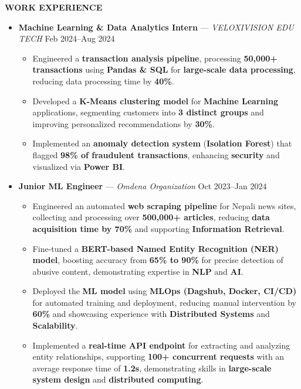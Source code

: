 \documentclass[a4paper,10pt]{article}
\newcommand{\resheading}[1]{%
  \vspace{1em}%
  \noindent\colorbox{mygrey}{%
    \parbox{\dimexpr\linewidth-2\fboxsep\relax}{%
      \textbf{#1}%
    }%
  }%
  \vspace{0.6em}%
}
\begin{document}
\resheading{WORK EXPERIENCE}
\vspace{0.4em}
\begin{itemize}
  \item \textbf{Machine Learning \& Data Analytics Intern} — \textit{VELOXIVISION EDU TECH} \hfill Feb 2024–Aug 2024
  \begin{itemize}
    \item Engineered a \textbf{transaction analysis pipeline}, processing \textbf{50,000+ transactions} using \textbf{Pandas \& SQL} for \textbf{large-scale data processing}, reducing data processing time by \textbf{40\%}.
    \item Developed a \textbf{K-Means clustering model} for \textbf{Machine Learning} applications, segmenting customers into \textbf{3 distinct groups} and improving personalized recommendations by \textbf{30\%}.
    \item Implemented an \textbf{anomaly detection system} (\textbf{Isolation Forest}) that flagged \textbf{98\% of fraudulent transactions}, enhancing \textbf{security} and visualized via \textbf{Power BI}.
  \end{itemize}

  \item \textbf{Junior ML Engineer} — \textit{Omdena Organization} \hfill Oct 2023–Jan 2024
  \begin{itemize}
    \item Engineered an automated \textbf{web scraping pipeline} for Nepali news sites, collecting and processing over \textbf{500,000+ articles}, reducing \textbf{data acquisition time by 70\%} and supporting \textbf{Information Retrieval}.
    \item Fine-tuned a \textbf{BERT-based Named Entity Recognition (NER) model}, boosting accuracy from \textbf{65\% to 90\%} for precise detection of abusive content, demonstrating expertise in \textbf{NLP} and \textbf{AI}.
    \item Deployed the \textbf{ML model} using \textbf{MLOps (Dagshub, Docker, CI/CD)} for automated training and deployment, reducing manual intervention by \textbf{60\%} and showcasing experience with \textbf{Distributed Systems} and \textbf{Scalability}.
    \item Implemented a \textbf{real-time API endpoint} for extracting and analyzing entity relationships, supporting \textbf{100+ concurrent requests} with an average response time of \textbf{1.2s}, demonstrating skills in \textbf{large-scale system design} and \textbf{distributed computing}.
  \end{itemize}


\end{itemize}
\end{document}
